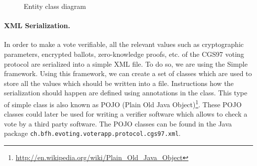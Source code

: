 \documentclass[numbers=noenddot, abstract=on, a4paper, headsepline,
footsepline, oneside, openright, draft=off, listof=leveldown]{scrreprt}
\begin{document}
\begin{figure}[htbp]
	\centering
	\caption{Entity class diagram}
	\label{fig:entities}
\end{figure}

\paragraph{XML Serialization.} In order to make a vote verifiable, all the
relevant values such as cryptographic parameters, encrypted ballots, zero-knowledge proofs, etc. of the
CGS97 voting protocol are serialized into a simple XML file. To do so, we are
using the Simple framework. Using this framework, we can create a set of classes
which are used to store all the values which should be written into a file.
Instructions how the serialization should happen are defined using annotations
in the class. This type of simple class is also known as POJO (Plain Old Java
Object)\footnote{\url{http://en.wikipedia.org/wiki/Plain_Old_Java_Object}}.
These POJO classes could later be used for writing a verifier software which
allows to check a vote by a third party software. The POJO classes can be found
in the Java package \texttt{ch.bfh.evoting.voterapp.protocol.cgs97.xml}.
\end{document}
